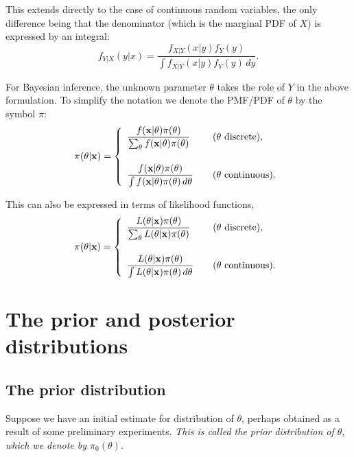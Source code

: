 This extends directly to the case of continuous random variables, the only difference being that the denominator (which is the marginal PDF of $X$) is expressed by an integral:
\[
f_{Y|X}(y|x) 
= \frac{f_{X|Y}(x|y)f_Y(y)}{\int f_{X|Y}(x|y)f_Y(y)\,dy}.
\]

For Bayesian inference, the unknown parameter $\theta$ takes the role of $Y$ in the above formulation. To simplify the notation we denote the PMF/PDF of $\theta$ by the symbol $\pi$: 
\[
\pi(\theta|\mathbf{x}) = \left\{\begin{array}{ll}
	\displaystyle\frac{f(\mathbf{x}|\theta)\pi(\theta)}{\sum_{\theta}f(\mathbf{x}|\theta)\pi(\theta)} 			& \text{\quad ($\theta$ discrete)}, \\[5ex]
	\displaystyle\frac{f(\mathbf{x}|\theta)\pi(\theta)}{\int f(\mathbf{x}|\theta)\pi(\theta)\,d\theta} 	& \text{\quad ($\theta$ continuous)}.
\end{array}\right.
\]

This can also be expressed in terms of likelihood functions,
\[
\pi(\theta|\mathbf{x}) = \left\{\begin{array}{ll}
	\displaystyle\frac{L(\theta|\mathbf{x})\pi(\theta)}{\sum_{\theta}L(\theta|\mathbf{x})\pi(\theta)} 			& \text{\quad ($\theta$ discrete)}, \\[5ex]
	\displaystyle\frac{L(\theta|\mathbf{x})\pi(\theta)}{\int L(\theta|\mathbf{x})\pi(\theta)\,d\theta} 	& \text{\quad ($\theta$ continuous)}.
\end{array}\right.
\]

\section{The prior and posterior distributions}

\subsection*{The prior distribution}
Suppose we have an initial estimate for distribution of $\theta$, perhaps obtained as a result of some preliminary experiments. 
\bit
\it This is called the \emph{prior distribution} of $\theta$, which we denote by $\pi_0(\theta)$.
\eit

